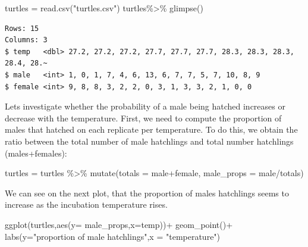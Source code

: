 \documentclass[
  letterpaper,
  DIV=11,
  numbers=noendperiod]{scrartcl}
\newenvironment{Shaded}{\begin{snugshade}}{\end{snugshade}}
\newcommand{\AttributeTok}[1]{\textcolor[rgb]{0.40,0.45,0.13}{#1}}
\newcommand{\FunctionTok}[1]{\textcolor[rgb]{0.28,0.35,0.67}{#1}}
\newcommand{\NormalTok}[1]{\textcolor[rgb]{0.00,0.23,0.31}{#1}}
\newcommand{\OtherTok}[1]{\textcolor[rgb]{0.00,0.23,0.31}{#1}}
\newcommand{\SpecialCharTok}[1]{\textcolor[rgb]{0.37,0.37,0.37}{#1}}
\newcommand{\StringTok}[1]{\textcolor[rgb]{0.13,0.47,0.30}{#1}}
\begin{document}
\begin{Shaded}
\begin{Highlighting}[]
\NormalTok{turtles }\OtherTok{=} \FunctionTok{read.csv}\NormalTok{(}\StringTok{"turtles.csv"}\NormalTok{)}
\NormalTok{turtles}\SpecialCharTok{\%\textgreater{}\%} \FunctionTok{glimpse}\NormalTok{()}
\end{Highlighting}
\end{Shaded}

\begin{verbatim}
Rows: 15
Columns: 3
$ temp   <dbl> 27.2, 27.2, 27.2, 27.7, 27.7, 27.7, 28.3, 28.3, 28.3, 28.4, 28.~
$ male   <int> 1, 0, 1, 7, 4, 6, 13, 6, 7, 7, 5, 7, 10, 8, 9
$ female <int> 9, 8, 8, 3, 2, 2, 0, 3, 1, 3, 3, 2, 1, 0, 0
\end{verbatim}

Lets investigate whether the probability of a male being hatched
increases or decrease with the temperature. First, we need to compute
the proportion of males that hatched on each replicate per temperature.
To do this, we obtain the ratio between the total number of male
hatchlings and total number hatchlings (males+females):

\begin{Shaded}
\begin{Highlighting}[]
\NormalTok{turtles }\OtherTok{=}\NormalTok{ turtles }\SpecialCharTok{\%\textgreater{}\%} 
  \FunctionTok{mutate}\NormalTok{(}\AttributeTok{totals =}\NormalTok{ male}\SpecialCharTok{+}\NormalTok{female,}
         \AttributeTok{male\_props =}\NormalTok{ male}\SpecialCharTok{/}\NormalTok{totals)}
\end{Highlighting}
\end{Shaded}

We can see on the next plot, that the proportion of males hatchlings
seems to increase as the incubation temperature rises.

\begin{Shaded}
\begin{Highlighting}[]
\FunctionTok{ggplot}\NormalTok{(turtles,}\FunctionTok{aes}\NormalTok{(}\AttributeTok{y=}\NormalTok{ male\_props,}\AttributeTok{x=}\NormalTok{temp))}\SpecialCharTok{+}
  \FunctionTok{geom\_point}\NormalTok{()}\SpecialCharTok{+} 
  \FunctionTok{labs}\NormalTok{(}\AttributeTok{y=}\StringTok{"proportion of male hatchlings"}\NormalTok{,}\AttributeTok{x =} \StringTok{"temperature"}\NormalTok{)}
\end{Highlighting}
\end{Shaded}
\end{document}
